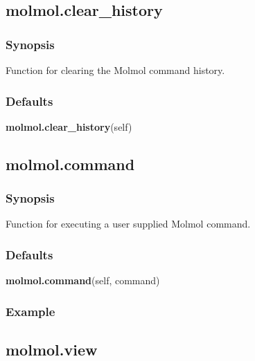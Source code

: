 \newpage

\subsection{molmol.clear\_history}


\subsubsection{Synopsis}

Function for clearing the Molmol command history.



\subsubsection{Defaults}

\textsf{\textbf{molmol.clear\_history}(self)}



\newpage

\subsection{molmol.command}


\subsubsection{Synopsis}

Function for executing a user supplied Molmol command.



\subsubsection{Defaults}

\textsf{\textbf{molmol.command}(self, command)}


\subsubsection{Example}




\newpage

\subsection{molmol.view}


